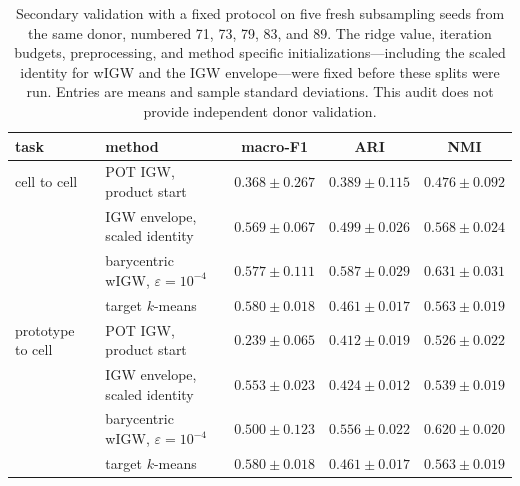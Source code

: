 \documentclass[11pt]{article}
\theoremstyle{plain}
\theoremstyle{definition}
\theoremstyle{remark}
\begin{document}
\begin{table}[H]
\centering
\footnotesize
\renewcommand{\arraystretch}{1.08}
\begin{tabular}{@{}llccc@{}}
\toprule
task & method & macro-F1 & ARI & NMI\\
\midrule
cell to cell
 & POT IGW, product start
 & \(0.368\pm0.267\) & \(0.389\pm0.115\) & \(0.476\pm0.092\)\\
 & IGW envelope, scaled identity
 & \(0.569\pm0.067\) & \(0.499\pm0.026\) & \(0.568\pm0.024\)\\
 & barycentric wIGW, \(\varepsilon=10^{-4}\)
 & \(0.577\pm0.111\) & \(\mathbf{0.587\pm0.029}\) &
   \(\mathbf{0.631\pm0.031}\)\\
 & target \(k\)-means
 & \(\mathbf{0.580\pm0.018}\) & \(0.461\pm0.017\) & \(0.563\pm0.019\)\\
\addlinespace[.2em]
prototype to cell
 & POT IGW, product start
 & \(0.239\pm0.065\) & \(0.412\pm0.019\) & \(0.526\pm0.022\)\\
 & IGW envelope, scaled identity
 & \(0.553\pm0.023\) & \(0.424\pm0.012\) & \(0.539\pm0.019\)\\
 & barycentric wIGW, \(\varepsilon=10^{-4}\)
 & \(0.500\pm0.123\) & \(\mathbf{0.556\pm0.022}\) &
   \(\mathbf{0.620\pm0.020}\)\\
 & target \(k\)-means
 & \(\mathbf{0.580\pm0.018}\) & \(0.461\pm0.017\) & \(0.563\pm0.019\)\\
\bottomrule
\end{tabular}
\par
\caption{Secondary validation with a fixed protocol on five fresh subsampling seeds
from the same donor, numbered 71, 73, 79, 83, and 89. The ridge value, iteration
budgets, preprocessing, and
method specific initializations---including the scaled identity for wIGW and the
IGW envelope---were fixed before these splits were run. Entries are means and
sample standard deviations. This audit does not provide independent donor validation.}
\label{tab:pbmc-postselection-validation}
\end{table}
\end{document}

